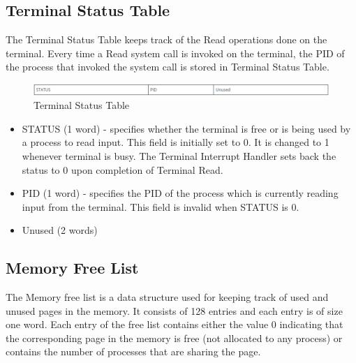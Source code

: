 \subsection{Terminal Status Table}
The Terminal Status Table keeps track of the Read operations done on the terminal. Every time a Read system call is invoked on the terminal, the PID of the process that invoked the system call is stored in Terminal Status Table. 
\begin{figure}[ht]
\centering
\includegraphics  [scale=0.55]{figures/ts.png}
\caption{\footnotesize Terminal Status Table}
\label{fig_1}
\end{figure}
\begin {itemize}

\item STATUS (1 word) - specifies whether the terminal is free or is being used by a process to read input. This field is initially set to 0. It is changed to 1 whenever terminal is busy. The Terminal Interrupt Handler sets back the status to 0 upon completion of Terminal Read.
\item PID (1 word) - specifies the PID of the process which is currently reading input from the terminal. This field is invalid when STATUS is 0.
\item Unused (2 words)
\end {itemize}
\subsection{Memory Free List}

The Memory free list is a data structure used for keeping track of used and unused pages in the memory. It consists of 128 entries and each entry is of size one word. Each entry of the free list contains either the value 0 indicating that the corresponding page in the memory is free (not allocated to any process) or contains the number of processes that are sharing the page. 
